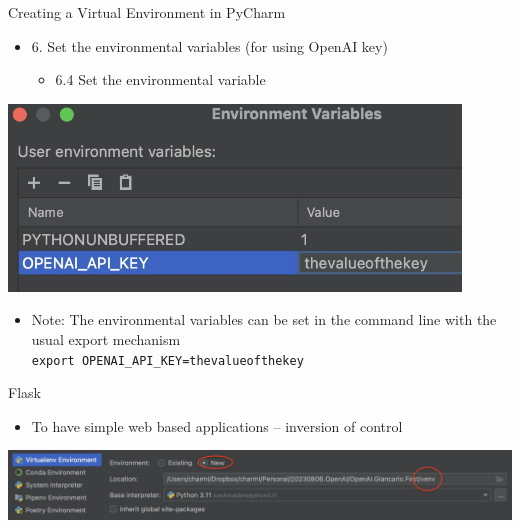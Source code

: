\documentclass{beamer}
\begin{document}
\begin{frame}
{\centerline{Creating a Virtual Environment in PyCharm}}
\begin{itemize}
    \item 6. Set the environmental variables (for using OpenAI key) 
    \begin{itemize}
    \item 6.4 Set the environmental variable
    \end{itemize} 
\end{itemize} 
\begin{center}
    \includegraphics[width=0.9\textwidth]{Coding/PyCharm.SpecifyEnvironmentalVariable.jpg}
\end{center}
\begin{itemize}
    \item Note: The environmental variables can be set in the command line with the usual export mechanism \\ \texttt{export OPENAI\_API\_KEY=thevalueofthekey}

    \end{itemize} 

\end{frame}








\begin{frame}
{\centerline{Flask}}
\begin{itemize}
    \item To have simple web based applications -- inversion of control
\end{itemize} 
\begin{center}
    \includegraphics[width=\textwidth]{Coding/PyCharm.VirtualEnvironment.jpg}
\end{center}
\end{frame}
\end{document}
